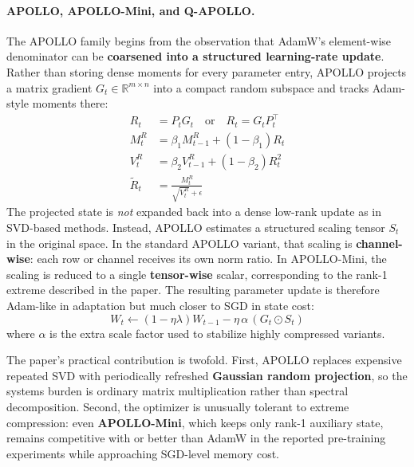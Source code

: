 \documentclass[11pt,a4paper]{article}
\begin{document}
\paragraph{APOLLO, APOLLO-Mini, and Q-APOLLO.}
The APOLLO family \citep{zhu2025apollosgdlikememoryadamwlevel} begins from the observation that AdamW's element-wise denominator can be \textbf{coarsened into a structured learning-rate update}. Rather than storing dense moments for every parameter entry, APOLLO projects a matrix gradient $G_t \in \mathbb{R}^{m \times n}$ into a compact random subspace and tracks Adam-style moments there:
\begin{align}
R_t &= P_t G_t \quad\text{or}\quad R_t = G_t P_t^\top \\
M_t^R &= \beta_1 M_{t-1}^R + (1-\beta_1)R_t \\
V_t^R &= \beta_2 V_{t-1}^R + (1-\beta_2)R_t^2 \\
\widetilde{R}_t &= \frac{M_t^R}{\sqrt{V_t^R}+\epsilon}
\end{align}
The projected state is \emph{not} expanded back into a dense low-rank update as in SVD-based methods. Instead, APOLLO estimates a structured scaling tensor $S_t$ in the original space. In the standard APOLLO variant, that scaling is \textbf{channel-wise}: each row or channel receives its own norm ratio. In APOLLO-Mini, the scaling is reduced to a single \textbf{tensor-wise} scalar, corresponding to the rank-1 extreme described in the paper. The resulting parameter update is therefore Adam-like in adaptation but much closer to SGD in state cost:
\[
W_t \gets (1-\eta\lambda)W_{t-1} - \eta\,\alpha\,(G_t \odot S_t)
\]
where $\alpha$ is the extra scale factor used to stabilize highly compressed variants.

The paper's practical contribution is twofold. First, APOLLO replaces expensive repeated SVD with periodically refreshed \textbf{Gaussian random projection}, so the systems burden is ordinary matrix multiplication rather than spectral decomposition. Second, the optimizer is unusually tolerant to extreme compression: even \textbf{APOLLO-Mini}, which keeps only rank-1 auxiliary state, remains competitive with or better than AdamW in the reported pre-training experiments while approaching SGD-level memory cost.
\end{document}
